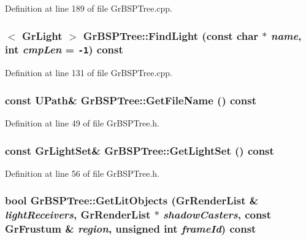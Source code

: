 Definition at line 189 of file GrBSPTree.cpp.\hypertarget{class_gr_b_s_p_tree_f2ace173c279ad61db04e13ed279d815}{
\subsubsection[{FindLight}]{$<$ {\bf GrLight} $>$ GrBSPTree::FindLight (const char $\ast$ {\em name}, \/  int {\em cmpLen} = {\tt -1}) const}}
\label{class_gr_b_s_p_tree_f2ace173c279ad61db04e13ed279d815}




Definition at line 131 of file GrBSPTree.cpp.\hypertarget{class_gr_b_s_p_tree_1e39974a60cdd4e087f2581a03300e18}{
\subsubsection[{GetFileName}]{\setlength{\rightskip}{0pt plus 5cm}const {\bf UPath}\& GrBSPTree::GetFileName () const}}
\label{class_gr_b_s_p_tree_1e39974a60cdd4e087f2581a03300e18}




Definition at line 49 of file GrBSPTree.h.\hypertarget{class_gr_b_s_p_tree_439816bd7db6f8c5d4998964d1d277f0}{
\subsubsection[{GetLightSet}]{\setlength{\rightskip}{0pt plus 5cm}const {\bf GrLightSet}\& GrBSPTree::GetLightSet () const}}
\label{class_gr_b_s_p_tree_439816bd7db6f8c5d4998964d1d277f0}




Definition at line 56 of file GrBSPTree.h.\hypertarget{class_gr_b_s_p_tree_5583beab3c16526e2ef1234cf3f2e210}{
\subsubsection[{GetLitObjects}]{\setlength{\rightskip}{0pt plus 5cm}bool GrBSPTree::GetLitObjects ({\bf GrRenderList} \& {\em lightReceivers}, \/  {\bf GrRenderList} $\ast$ {\em shadowCasters}, \/  const {\bf GrFrustum} \& {\em region}, \/  unsigned int {\em frameId}) const}}
\label{class_gr_b_s_p_tree_5583beab3c16526e2ef1234cf3f2e210}




